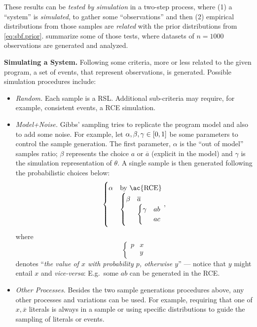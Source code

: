 \documentclass[adraft,copyright,creativecommons]{eptcs}
\newcommand{\co}[1]{\ensuremath{\overline{#1}}}
\begin{document}
These results can be \emph{tested by simulation} in a two-step process, where (1) a ``system'' is \emph{simulated}, to gather some ``observations'' and then (2) empirical distributions from those samples are \emph{related} with the prior distributions from \cref{eq:sbf.prior}.  summarize some of those tests, where datasets of $n = 1000$ observations are generated and analyzed.

\bigskip\noindent\textbf{Simulating a System.} Following some criteria, more or less related to the given program, a set of events, that represent observations, is generated. Possible simulation procedures include:
\begin{itemize}
    \item \emph{Random.} Each sample is a \ac{RSL}. Additional sub-criteria may require, for example, consistent events, a \ac{RCE} simulation.
    \item \emph{Model+Noise.} Gibbs' sampling \cite{geman84} tries to replicate the program model and also to add some noise. For example, let $\alpha, \beta, \gamma \in \intcc{0,1}$ be some parameters to control the sample generation. The first parameter, $\alpha$ is the ``out of model'' samples ratio; $\beta$ represents the choice $a$ or $\co{a}$ (explicit in the model) and $\gamma$ is the simulation representation of $\theta$. A single sample is then generated following the probabilistic choices below:
          $$
              \begin{cases}
                  \alpha & \text{by \ac{RCE}} \\%
                         &
                  \begin{cases}
                      \beta & \co{a} \\%
                            &
                      \begin{cases}
                          \gamma & ab \\%
                                 & ac
                      \end{cases}
                  \end{cases}
              \end{cases},
          $$
          where
          $$
              \begin{cases}
                  p & x \\%
                    & y
              \end{cases}
          $$
          denotes ``\emph{the value of $x$ with probability $p$, otherwise $y$}'' --- notice that $y$ might entail $x$ and \emph{vice-versa}: E.g.\ some $ab$ can be generated in the \ac{RCE}.
    \item \emph{Other Processes.} Besides the two sample generations procedures above, any other processes and variations can be used. For example, requiring that one of $x, \co{x}$ literals is always in a sample or using specific distributions to guide the sampling of literals or events.
\end{itemize}
\end{document}
